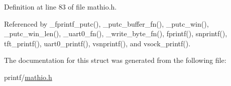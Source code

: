 Definition at line 83 of file mathio.\+h.



Referenced by \+\_\+fprintf\+\_\+putc(), \+\_\+putc\+\_\+buffer\+\_\+fn(), \+\_\+putc\+\_\+win(), \+\_\+putc\+\_\+win\+\_\+len(), \+\_\+uart0\+\_\+fn(), \+\_\+write\+\_\+byte\+\_\+fn(), fprintf(), snprintf(), tft\+\_\+printf(), uart0\+\_\+printf(), vsnprintf(), and vsock\+\_\+printf().



The documentation for this struct was generated from the following file\+:\begin{DoxyCompactItemize}
\item 
printf/\hyperlink{mathio_8h}{mathio.\+h}\end{DoxyCompactItemize}

